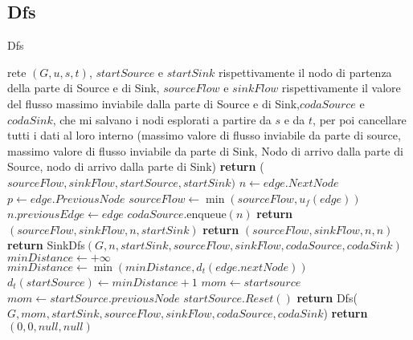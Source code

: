 \documentclass{article}
\begin{document}
\subsection{Dfs}
\begin{algorithm}
    \caption{Dfs}
    \begin{algorithmic}[1]
        \REQUIRE rete $(G,u,s,t)$, $startSource$ e $startSink$ rispettivamente il nodo di partenza della parte di Source e di Sink, $sourceFlow$ e $sinkFlow$ rispettivamente il valore del flusso massimo inviabile dalla parte di Source e di Sink,$codaSource$ e $codaSink$, che mi salvano i nodi esplorati a partire da $s$ e da $t$, per poi cancellare tutti i dati al loro interno
        \ENSURE (massimo valore di flusso inviabile da parte di source, massimo valore di flusso inviabile da parte di Sink, Nodo di arrivo dalla parte di Source, nodo di arrivo dalla parte di Sink)
        \STATE \textbf{return} ($sourceFlow,sinkFlow,startSource,startSink)$
            \ENDIF
            \STATE $n \leftarrow edge.NextNode$
            \STATE $p \leftarrow edge.PreviousNode$
            \STATE $sourceFlow \leftarrow \min(sourceFlow,u_f(edge))$
            \STATE $ n.previousEdge \leftarrow edge$ 
            \STATE $codaSource.$enqueue$(n)$
            \STATE \textbf{return } $(sourceFlow, sinkFlow,n,startSink)$
            \ENDIF
             
            \STATE \textbf{return}  $(sourceFlow, sinkFlow,n,n)$
            \ENDIF
            \STATE \textbf{return} SinkDfs$(G,n, startSink, sourceFlow, sinkFlow,codaSource,codaSink)$
            \ENDIF
            \ENDFOR
            \STATE $minDistance \leftarrow +\infty$
            \STATE $minDistance \leftarrow \min(minDistance, d_t(edge.nextNode))$
            \ENDIF
            \ENDFOR
            \STATE$d_t(startSource) \leftarrow minDistance+1$
            \STATE $mom \leftarrow startsource$
            \ELSE
            \STATE $mom \leftarrow startSource.previousNode$
            \ENDIF
            \STATE $startSource.Reset()$
            \STATE \textbf{return} Dfs($G,mom, startSink, sourceFlow, sinkFlow,codaSource,codaSink$)
            \ENDIF
            \STATE \textbf{return} $(0,0,null,null)$
    \end{algorithmic}
\end{algorithm}
\end{document}

